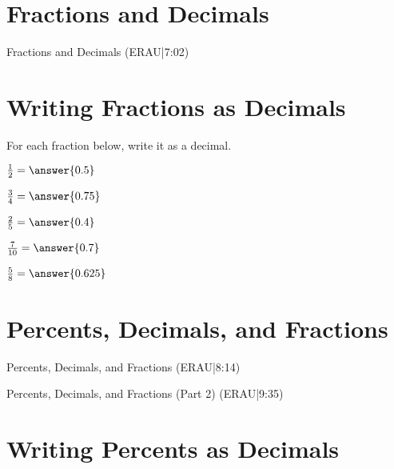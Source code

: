 \documentclass{ximera}
\begin{document}

\section*{Fractions and Decimals}

Fractions and Decimals (ERAU|7:02)


\section*{Writing Fractions as Decimals}


For each fraction below, write it as a decimal.

\begin{problem}
$\frac{1}{2} = \answer{0.5}$
\end{problem}

\begin{problem}
$\frac{3}{4} = \answer{0.75}$
\end{problem}

\begin{problem}
$\frac{2}{5} = \answer{0.4}$
\end{problem}

\begin{problem}
$\frac{7}{10} = \answer{0.7}$
\end{problem}

\begin{problem}
$\frac{5}{8} = \answer{0.625}$
\end{problem}


\section*{Percents, Decimals, and Fractions}

Percents, Decimals, and Fractions (ERAU|8:14)


Percents, Decimals, and Fractions (Part 2) (ERAU|9:35)



\section*{Writing Percents as Decimals}
\end{document}
